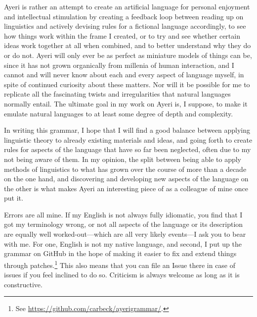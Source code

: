 Ayeri is rather an attempt to create an artificial language for personal 
enjoyment and intellectual stimulation by creating a feedback loop between 
reading up on linguistics and actively devising rules for a fictional language 
accordingly, to see how things work within the frame I created, or to try and 
see whether certain ideas work together at all when combined, and to better
understand why they do or do not. Ayeri will only ever be as perfect as 
miniature models of things can be, since it has not grown organically from 
millenia of human interaction, and I cannot and will never know about each and 
every aspect of language myself, in spite of continued curiosity about these 
matters. Nor will it be possible for me to replicate all the fascinating twists 
and irregularities that natural languages normally entail. The ultimate 
goal in my work on Ayeri is, I suppose, to make it emulate natural 
languages to at least some degree of depth and complexity.

In writing this grammar, I hope that I will find a good balance between 
applying linguistic theory to already existing materials and ideas, and going 
forth to create rules for aspects of the language that have so far been 
neglected, often due to my not being aware of them. In my opinion, the split 
between being able to apply methods of linguistics to what has grown over the 
course of more than a decade on the one hand, and discovering and developing 
new aspects of the language on the other is what makes Ayeri an interesting 
piece of  as a colleague of mine once put it.

Errors are all mine. If my English is not always fully idiomatic, you find that 
I got my terminology wrong, or not all aspects of the language or its 
description are equally well worked-out---which are all very likely events---I 
ask you to bear with me. For one, English is not my native language, and second, 
I put up the grammar on GitHub in the hope of making it easier to fix and extend 
things through patches.\footnote{See 
\href{https://github.com/carbeck/ayerigrammar}%
{https://github.com/carbeck/ayerigrammar/}.}
This also means that you can file an Issue there in case of issues if you feel 
inclined to do so. Criticism is always welcome as long as it is constructive.
